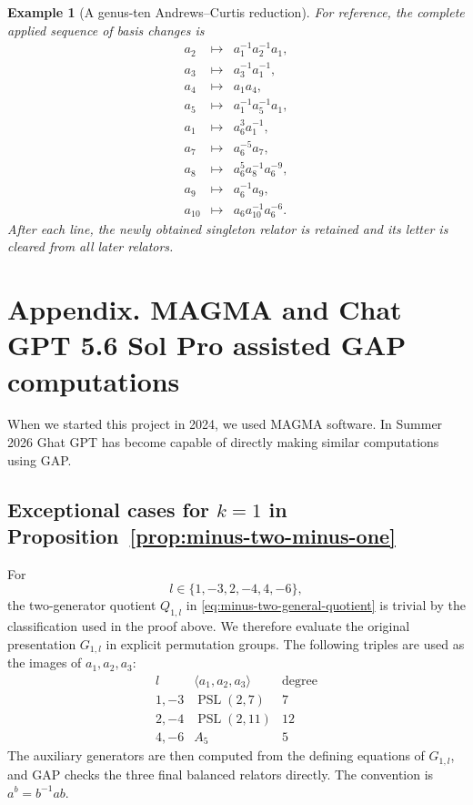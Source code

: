 \documentclass{article}
\newtheorem{example}[theorem]{Example}
\begin{document}
\begin{example}[A genus-ten Andrews--Curtis reduction]
For reference, the complete applied sequence of basis changes is
\[
\begin{array}{rcl}
 a_2&\mapsto&a_1^{-1}a_2^{-1}a_1,\\
 a_3&\mapsto&a_3^{-1}a_1^{-1},\\
 a_4&\mapsto&a_1a_4,\\
 a_5&\mapsto&a_1^{-1}a_5^{-1}a_1,\\
 a_1&\mapsto&a_6^3a_1^{-1},\\
 a_7&\mapsto&a_6^{-5}a_7,\\
 a_8&\mapsto&a_6^5a_8^{-1}a_6^{-9},\\
 a_9&\mapsto&a_6^{-1}a_9,\\
 a_{10}&\mapsto&a_6a_{10}^{-1}a_6^{-6}.
\end{array}
\]
After each line, the newly obtained singleton relator is retained and its
letter is cleared from all later relators.
\end{example}

\section{Appendix. MAGMA and Chat GPT 5.6 Sol Pro assisted GAP computations}\label{app:computer-computations}

When we started this project in 2024, we used MAGMA software. In Summer 2026 Ghat GPT has become capable of directly making similar computations using GAP.
\subsection{Exceptional cases for \(k=1\) in Proposition~\ref{prop:minus-two-minus-one}}
\label{app:k-one-gap}

For
\[
 l\in\{1,-3,2,-4,4,-6\},
\]
the two-generator quotient \(Q_{1,l}\) in
\eqref{eq:minus-two-general-quotient} is trivial by the classification
used in the proof above.  We therefore evaluate the original presentation
\(G_{1,l}\) in explicit permutation groups.
The following triples are used as the images of \(a_1,a_2,a_3\):
\[
\begin{array}{c|c|c}
 l & \langle a_1,a_2,a_3\rangle & \text{degree}\\ \hline
 1,-3 & \operatorname{PSL}(2,7) & 7\\
 2,-4 & \operatorname{PSL}(2,11) & 12\\
 4,-6 & A_5 & 5
\end{array}
\]
The auxiliary generators are then computed from the defining equations of
\(G_{1,l}\), and GAP checks the three final balanced relators directly.
The convention is \(a^b=b^{-1}ab\).
\end{document}
